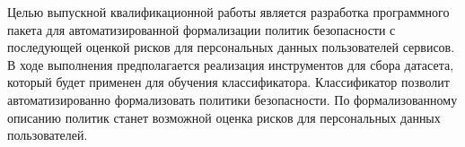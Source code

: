 \documentclass[../main]{subfiles}
\begin{document}
Целью выпускной квалификационной работы является разработка программного пакета для автоматизированной формализации политик безопасности с последующей оценкой рисков для персональных данных пользователей сервисов. В ходе выполнения предполагается реализация инструментов для сбора датасета, который будет применен для обучения классификатора. Классификатор позволит автоматизированно формализовать политики безопасности. По формализованному описанию политик станет возможной оценка рисков для персональных данных пользователей.
\end{document}
